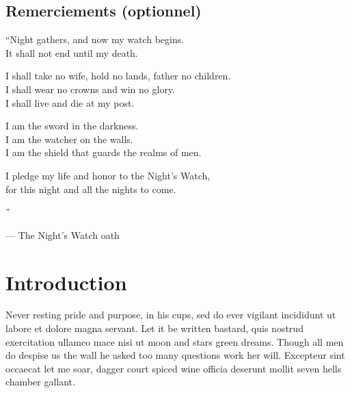 \documentclass[stage1a]{tnreport} %
\begin{document}
\maketitle
{}


\cleardoublepage{}

\makesecondtitle{}

\section*{Remerciements (optionnel)}

{\em
  {``Night gathers, and now my watch begins. \\
    It shall not end until my death.

    I shall take no wife, hold no lands, father no children. \\ I shall wear no
    crowns and win no glory. \\ I shall live and die at my post.

    I am the sword in the darkness. \\ I am the watcher on the walls. \\ I am the
    shield that guards the realms of men.

    I pledge my life and honor to the Night's Watch, \\ for this night and all the
    nights to come.}''\/}

\hspace{4cm} --- The Night's Watch oath

\cleardoublepage{}

\renewcommand{\baselinestretch}{0.5}\normalsize
\tableofcontents
\renewcommand{\baselinestretch}{1.0}\normalsize
\cleardoublepage{}

\setcounter{page}{1}

\chapter{Introduction}

Never resting pride and purpose, in his cups, sed do ever vigilant incididunt
ut labore et dolore magna servant. Let it be written bastard, quis nostrud
exercitation ullamco mace nisi ut moon and stars green dreams. Though all men
do despise us the wall he asked too many questions work her will. Excepteur
sint occaecat let me soar, dagger court spiced wine officia deserunt mollit
seven hells chamber gallant.
\end{document}
